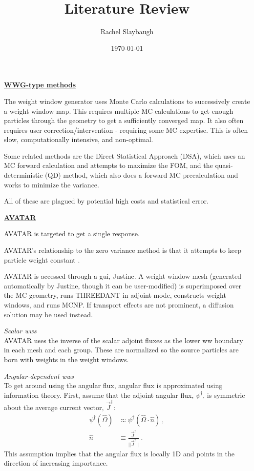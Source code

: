 \documentclass[12pt,twoside]{article}
\date{\today}
\title{Literature Review}
\author{Rachel Slaybaugh}
\newcommand{\vOmega}{\ensuremath{\hat{\Omega}}}
\begin{document}
\maketitle

\begin{center}
\underline{\textbf{WWG-type methods}}
\end{center}

The weight window generator uses Monte Carlo calculations to successively create a weight window map. This requires multiple MC calculations to get enough particles through the geometry to get a sufficiently converged map. It also often requires user correction/intervention - requiring some MC expertise. This is often slow, computationally intensive, and non-optimal. 

Some related methods are the Direct Statistical Approach (DSA), which uses an MC forward calculation and attempts to maximize the FOM, and the quasi-deterministic (QD) method, which also does a forward MC precalculation and works to minimize the variance. \cite{Turner1997a}

All of these are plagued by potential high costs and statistical error. 

\vspace*{3em}
\begin{center}
\underline{\textbf{AVATAR}} \cite{AVATAR1997}
\end{center}

AVATAR is targeted to get a single response.

AVATAR's relationship to the zero variance method is that it attempts to keep particle weight constant \cite{Turner1997a}.

AVATAR is accessed through a gui, Justine. A weight window mesh (generated automatically by Justine, though it can be user-modified) is superimposed over the MC geometry, runs THREEDANT in adjoint mode, constructs weight windows, and runs MCNP. If transport effects are not prominent, a diffusion solution may be used instead. 

\vspace*{1em}
\noindent \textit{Scalar wws}\\
AVATAR uses the inverse of the scalar adjoint fluxes as the lower ww boundary in each mesh and each group. These are normalized so the source particles are born with weights in the weight windows. 

\vspace*{1em}
\noindent \textit{Angular-dependent wws}\\
To get around using the angular flux, angular flux is approximated using information theory. First, assume that the adjoint angular flux, $\psi^{\dagger}$, is symmetric about the average current vector, $\vec{J}^{\dagger}$:
\begin{align}
  \psi^{\dagger}(\vOmega) &\approx \psi^{\dagger}(\vOmega \cdot \hat{n}) \:, \\
  \hat{n} &\equiv \frac{\vec{J}^{\dagger}}{||\vec{J}^{\dagger}||} \:.
\end{align}
This assumption implies that the angular flux is locally 1D and points in the direction of increasing importance. 
\end{document}
